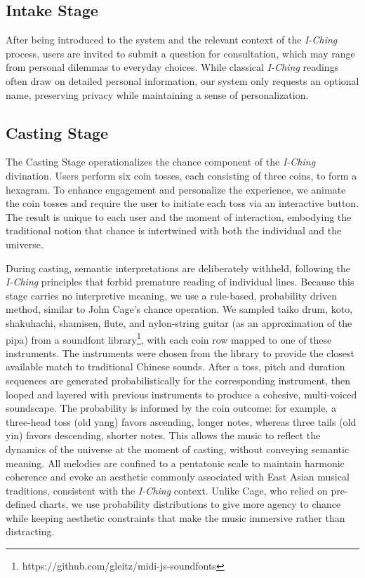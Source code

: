 \documentclass{article}
\begin{document}
\subsection{Intake Stage}\label{subsec:intake}
After being introduced to the system and the relevant context of the \textit{I-Ching} process, users are invited to submit a question for consultation, which may range from personal dilemmas to everyday choices.
While classical \textit{I-Ching} readings often draw on detailed personal information, our system only requests an optional name, preserving privacy while maintaining a sense of personalization.

\subsection{Casting Stage}\label{subsec:casting}
The Casting Stage operationalizes the chance component of the \textit{I-Ching} divination. 
Users perform six coin tosses, each consisting of three coins, to form a hexagram. 
To enhance engagement and personalize the experience, we animate the coin tosses and require the user to initiate each toss via an interactive button. 
The result is unique to each user and the moment of interaction, embodying the traditional notion that chance is intertwined with both the individual and the universe.

During casting, semantic interpretations are deliberately withheld, following the \textit{I-Ching} principles that forbid premature reading of individual lines. 
Because this stage carries no interpretive meaning, we use a rule-based, probability driven method, similar to John Cage's chance operation.
We sampled taiko drum, koto, shakuhachi, shamisen, flute, and nylon-string guitar (as an approximation of the pipa) from a soundfont library\footnote{https://github.com/gleitz/midi-js-soundfonts}, with each coin row mapped to one of these instruments.
The instruments were chosen from the library to provide the closest available match to traditional Chinese sounds.
After a toss, pitch and duration sequences are generated probabilistically for the corresponding instrument, then looped and layered with previous instruments to produce a cohesive, multi-voiced soundscape.
The probability is informed by the coin outcome: for example, a three-head toss (old yang) favors ascending, longer notes, whereas three tails (old yin) favors descending, shorter notes. 
This allows the music to reflect the dynamics of the universe at the moment of casting, without conveying semantic meaning. 
All melodies are confined to a pentatonic scale to maintain harmonic coherence and evoke an aesthetic commonly associated with East Asian musical traditions, consistent with the \textit{I-Ching} context.
Unlike Cage, who relied on pre-defined charts, we use probability distributions to give more agency to chance while keeping aesthetic constraints that make the music immersive rather than distracting.
\end{document}
